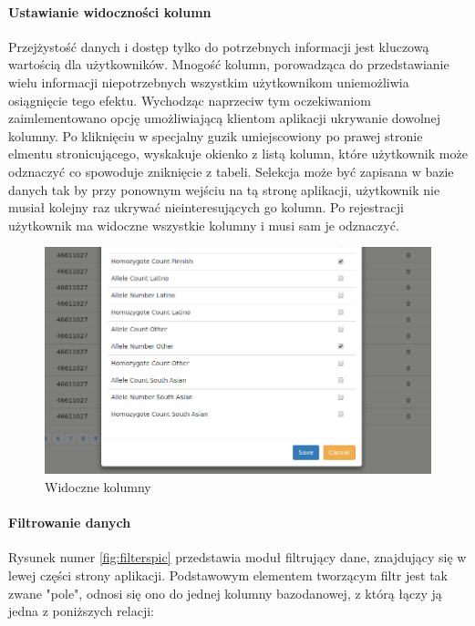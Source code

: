\documentclass[a4paper,12pt,twoside]{article}
\begin{document}
\newpage
\paragraph{Ustawianie widoczności kolumn}
Przejżystość danych i dostęp tylko do potrzebnych informacji jest kluczową wartością dla użytkowników.
Mnogość kolumn, porowadząca do przedstawianie wielu informacji niepotrzebnych 
wszystkim użytkownikom uniemożliwia osiągnięcie tego efektu. Wychodząc naprzeciw tym oczekiwaniom 
zaimlementowano opcję umożliwiającą klientom aplikacji ukrywanie dowolnej kolumny.
Po kliknięciu w specjalny guzik umiejscowiony po prawej stronie elmentu stronicującego, wyskakuje okienko z listą kolumn,
które użytkownik może odznaczyć co spowoduje zniknięcie z tabeli. Selekcja może być zapisana 
w bazie danych tak by przy ponownym wejściu na tą stronę aplikacji, użytkownik nie musiał
kolejny raz ukrywać nieinteresujących go kolumn. Po rejestracji użytkownik ma widoczne wszystkie
kolumny i musi sam je odznaczyć.

\begin{figure}[h]
  \includegraphics[width=\linewidth]{obrazy/aplikacja/visible_columns.png}
  \caption{Widoczne kolumny}
  \label{fig:visible_columnspic}
\end{figure}

\newpage
\paragraph{Filtrowanie danych}
Rysunek numer \ref{fig:filterspic} przedstawia moduł filtrujący dane, znajdujący się w
lewej części strony aplikacji.
Podstawowym elementem tworzącym filtr jest tak zwane "pole", odnosi się ono do jednej kolumny
bazodanowej, z którą łączy ją jedna z poniższych relacji: 
\end{document}

